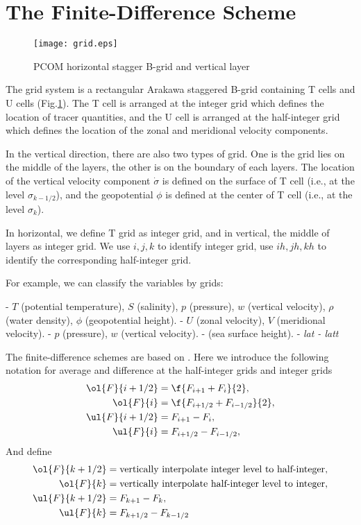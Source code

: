 
\section{The Finite-Difference Scheme}

\begin{figure}[h!]
  \texttt{[image: grid.eps]} %
  \caption{\small PCOM horizontal stagger B-grid and vertical layer} \label{fig:grid}
\end{figure}

The grid system is a rectangular Arakawa staggered B-grid \citep{Bryan1969}
containing T cells and U cells (Fig.\ref{fig:grid}). 
The T cell is arranged at the integer
grid which defines the location of tracer quantities, and the U cell
is arranged at the half-integer grid which defines the location of
the zonal and meridional velocity components. 

In the vertical direction, there are also two types of grid. One is the grid
lies on the middle of the layers, the other is on the boundary of each layers.
The location of the vertical
velocity component $\dot{\sigma}$ is defined on the surface of T
cell (i.e., at the level $\sigma_{k-1/2}$), and the geopotential
$\phi$ is defined at the center of T cell (i.e., at the level $\sigma_{k}$).

In horizontal, we define T grid as integer grid, and in vertical, the middle of
layers as integer grid. We use $i,j,k$ to identify integer grid, use $ih, jh,
kh$ to identify the corresponding half-integer grid.

For example, we can classify the variables by grids:

\bd

 - $T$ (potential temperature), $S$ (salinity), 
$p$ (pressure), $w$ (vertical velocity), $\rho$ (water density), $\phi$
(geopotential height).
 - $U$ (zonal velocity), $V$ (meridional velocity).
 - $p$ (pressure), $w$ (vertical velocity).
 -  (sea surface height). 
 -  \em{lat}
 -  \em{latt}

\ed

The finite-difference schemes are based on \citet{Zeng1987}.
Here we introduce the following notation for average and difference
at the half-integer grids and integer grids
\bese
\begin{align}
  \ol{F}{i+1/2} &= \f{F_{i+1} + F_i}{2},\\
      \ol{F}{i} &= \f{F_{i+1/2} + F_{i-1/2}}{2},\\
  \ul{F}{i+1/2} &= F_{i+1} - F_i,\\
      \ul{F}{i} &= F_{i+1/2} - F_{i-1/2},
\end{align}
\ense
And define
\bese
\begin{align}
  \ol{F}{k+1/2} &= \text{vertically interpolate integer level to half-integer},\\
      \ol{F}{k} &= \text{vertically interpolate half-integer level to integer},\\
  \ul{F}{k+1/2} &= F_{k+1} - F_k,\\
      \ul{F}{k} &= F_{k+1/2} - F_{k-1/2}
\end{align}
\ense

